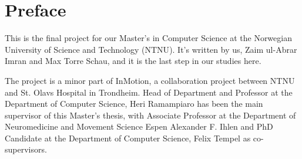 \chapter*{Preface}
This is the final project for our Master's in Computer Science at the Norwegian University of Science and Technology (\gls{NTNU}). It's written by us, Zaim ul-Abrar Imran and Max Torre Schau, and it is the last step in our studies here.

The project is a minor part of InMotion, a collaboration project between \gls{NTNU} and St. Olavs Hospital in Trondheim. Head of Department and Professor at the Department of Computer Science, Heri Ramampiaro has been the main supervisor of this Master's thesis, with Associate Professor at the Department of Neuromedicine and Movement Science Espen Alexander F. Ihlen and  PhD Candidate at the Department of Computer Science, Felix Tempel as co-supervisors. 